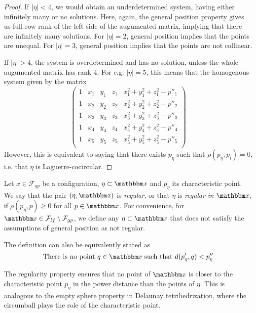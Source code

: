 \begin{proof}
	If $|\eta|<4$, we would obtain an underdetermined system, having either infinitely many or no solutions.  Here, again, the general position property gives us full row rank of the left side of the augumented matrix, implying that there are infinitely many solutions. For $|\eta|=2$, general position implies that the points are unequal. For $|\eta| =3$, general position implies that the points are not collinear.


	If $|\eta|>4$, the system is overdetermined and has no solution, unless the whole augumented matrix has rank $4$. For e.g. $|\eta|=5$, this means that the homogenous system given by the matrix 
	$$
	\begin{pmatrix}\label{circmat}
		1 & x_1 & y_1 & z_1 & x_1^2 + y_1^2 + z_1^2 - p''_1  \\
		1 & x_2 & y_2 & z_2 & x_2^2 + y_2^2 + z_2^2 - p''_2  \\
		1 & x_3 & y_3 & z_3 & x_3^2 + y_3^2 + z_3^2 - p''_3  \\
		1 & x_4 & y_4 & z_4 & x_4^2 + y_4^2 + z_4^2 - p''_4  \\
		1 & x_5 & y_5 & z_5 & x_5^2 + y_5^2 + z_5^2 - p''_5  \\
	\end{pmatrix}
	$$
	However, this is equivalent to saying that there exists $p_\eta$ such that $\rho(p_\eta,p_i)=0$, i.e. that $\eta$ is Laguerre-cocircular.
\end{proof}

\begin{definition}
	Let $x\in \mathcal F_{gp}$ be a configuration, $\eta \subset \x$ and $p_\eta$ its characteristic point. We say that the pair $(\eta,\x)$ is \textit{regular}, or that $\eta$ is \textit{regular in} $\x$, if $\rho(p_\eta,p)\geq 0$ for all $p\in\x$.	
	For convenience, for $\x \in \mathcal F_{lf}\setminus \mathcal F_{gp}$, we define any $\eta\subset \x$ that does not satisfy the assumptions of general position as not regular.
\end{definition}
The definition can also be equivalently stated as 
$$\text{There is no point } q\in\x \text{ such that } d(p'_\eta,q)<p''_\eta$$

The regularity property ensures that no point of $\x$ is closer to the characteristic point $p_\eta$ in the power distance than the points of $\eta$. This is analogous to the empty sphere property in Delaunay tetrihedrization, where the circumball plays the role of the characteristic point.   

